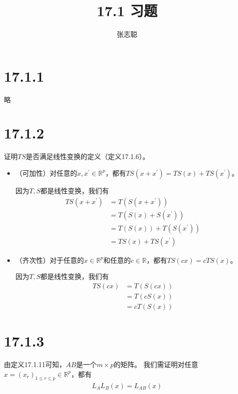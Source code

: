 \documentclass{article}
\begin{document}
\title{17.1 习题}
\author{张志聪}
\maketitle

\section*{17.1.1}

略

\section*{17.1.2}

证明$TS$是否满足线性变换的定义（定义17.1.6）。

\begin{itemize}
  \item （可加性）对任意的$x, x^\prime \in \mathbb{R}^p$，都有$TS(x + x^\prime) = TS(x) + TS(x^\prime)$。

        因为$T,S$都是线性变换，我们有
        \begin{align*}
          TS(x + x^\prime) & = T(S(x + x^\prime))       \\
                           & = T(S(x) + S(x^\prime))    \\
                           & = T(S(x)) + T(S(x^\prime)) \\
                           & = TS(x) + TS(x^\prime)
        \end{align*}

  \item （齐次性）对于任意的$x \in \mathbb{R}^p$和任意的$c \in \mathbb{R}$，都有$TS(cx) = cTS(x)$。

        因为$T,S$都是线性变换，我们有
        \begin{align*}
          TS(cx) & = T(S(cx)) \\
                 & = T(cS(x)) \\
                 & = cT(S(x))
        \end{align*}
\end{itemize}

\section*{17.1.3}

由定义17.1.11可知，$AB$是一个$m \times p$的矩阵。
我们需证明对任意$x = (x_r)_{1 \leq r \leq p} \in \mathbb{R}^p$，都有
\begin{align*}
  L_AL_B(x) = L_{AB}(x)
\end{align*}
\end{document}
